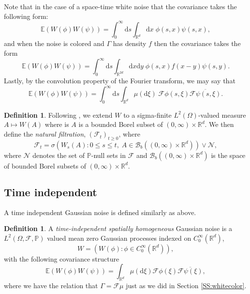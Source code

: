 \documentclass[12pt]{report}
\theoremstyle{plain}
\theoremstyle{definition}
\newtheorem{definition}[theorem]{Definition}
\numberwithin{equation}{section}
\newcommand{\R}{\mathbb{R}}
\newcommand{\ud}{\ensuremath{ \mathrm{d} }}
\begin{document}
Note that in the case of a space-time white noise that the covariance takes the following form:
	\[
		\mathbb{E}\left(W(\phi)W(\psi)\right) = \int_0^\infty \ud s \int_{\R^{d}}\ud x \; \phi(s,x) \psi(s ,x),
	\]
and when the noise is colored and $\Gamma$ has density $f$ then the covariance takes the form
	\begin{equation} \label{E:CorrDensity}
		\mathbb{E}\left(W(\phi)W(\psi)\right) = \int_0^\infty \ud s \int_{\R^{2d}}\ud x \ud y \; \phi(s,x) f(x-y) \psi(s ,y).
	\end{equation}
Lastly, by the convolution property of the Fourier transform, we may say that 
	\[
		\mathbb{E}\left(W(\phi)W(\psi)\right) = \int_0^\infty \ud s \int_{\R^{d}} \mu(\ud \xi) \; \mathcal{F}\phi(s,\xi)  \overline{\mathcal{F}\psi(s , \xi)}.
	\]	
	
\begin{definition}
	Following \cite{walsh:86:introduction}, we extend $W$ to a sigma-finite $L^2(\Omega)$-valued measure $A \mapsto W(A)$ where is $A$ is a bounded Borel subset of $(0, \infty) \times \R^d$. We then define the {\em natural filtration}, $(\mathcal{F}_t)_{t \ge 0}$, where 
		\[
			\mathcal{F}_t = \sigma \left( W_s(A) : 0 \le s \le t, \; A \in \mathscr{B}_b((0,\infty) \times \R^d) \right) \vee \mathcal{N},
		\]
	where $\mathcal{N}$ denotes the set of $\mathbb{P}$-null sets in $\mathcal{F}$ and $\mathscr{B}_b((0,\infty) \times \R^d)$ is the space of bounded Borel subsets of $(0,\infty) \times \R^d$.
\end{definition}


\subsection{Time independent}\label{SS:timeind}

A time independent Gaussian noise is defined similarly as above.

\begin{definition}
	A {\em time-independent spatially homogeneous} Gaussian noise is a $L^2(\Omega, \mathcal{F}, \mathbb{P})$ valued mean zero Gaussian processes indexed on $C_0^{\infty}(\R^d)$,	
	\[
		W = \left(W(\phi) :  \phi \in C_0^{\infty}(\R^d)\right),
	\]
	with the following covariance structure
	\[
		\mathbb{E}\left(W(\phi)W(\psi)\right) = \int_{\R^{d}} \mu(\ud \xi)  \mathcal{F}\phi(\xi) \overline{\mathcal{F}\psi(\xi)},
	\]
	where we have the relation that $\Gamma = \mathcal{F}\mu$ just as we did in Section \ref{SS:whitecolor}.
\end{definition}
\end{document}
